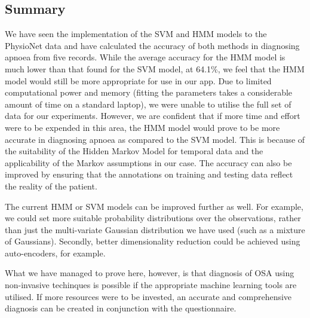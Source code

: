 \subsection{Summary}
\label{sec:mlExperimentsSummary}

We have seen the implementation of the SVM and HMM models to the PhysioNet data and have calculated the accuracy of both methods in diagnosing apnoea from five records. While the average accuracy for the HMM model is much lower than that found for the SVM model, at 64.1\%, we feel that the HMM model would still be more appropriate for use in our app. Due to limited computational power and memory (fitting the parameters takes a considerable amount of time on a standard laptop), we were unable to utilise the full set of data for our experiments. However, we are confident that if more time and effort were to be expended in this area, the HMM model would prove to be more accurate in diagnosing apnoea as compared to the SVM model. This is because of the suitability of the Hidden Markov Model for temporal data and the applicability of the Markov assumptions in our case. The accuracy can also be improved by ensuring that the annotations on training and testing data reflect the reality of the patient.

The current HMM or SVM models can be improved further as well. For example, we could set more suitable probability distributions over the observations, rather than just the multi-variate Gaussian distribution we have used (such as a mixture of Gaussians). Secondly, better dimensionality reduction could be achieved using auto-encoders, for example.

What we have managed to prove here, however, is that diagnosis of OSA using non-invasive techinques is possible if the appropriate machine learning tools are utilised. If more resources were to be invested, an accurate and comprehensive diagnosis can be created in conjunction with the questionnaire.